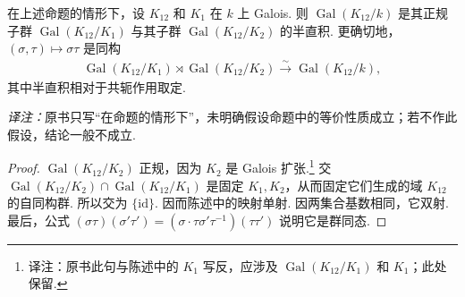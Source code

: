 \begin{corollary*}在上述命题的情形下，设 $K_{12}$ 和 $K_1$ 在 $k$ 上 Galois. 则 $\operatorname{Gal}(K_{12}/k)$ 是其正规子群 $\operatorname{Gal}(K_{12}/K_1)$ 与其子群 $\operatorname{Gal}(K_{12}/K_2)$ 的半直积. 更确切地，$(\sigma,\tau)\mapsto\sigma\tau$ 是同构
\begin{align*}\operatorname{Gal}(K_{12}/K_1)\rtimes\operatorname{Gal}(K_{12}/K_2)\xrightarrow{\sim}\operatorname{Gal}(K_{12}/k),\end{align*}
其中半直积相对于共轭作用取定.\end{corollary*}
\noindent\emph{译注：}原书只写``在命题的情形下''，未明确假设命题中的等价性质成立；若不作此假设，结论一般不成立.
\begin{proof}$\operatorname{Gal}(K_{12}/K_2)$ 正规，因为 $K_2$ 是 Galois 扩张.\footnote{译注：原书此句与陈述中的 $K_1$ 写反，应涉及 $\operatorname{Gal}(K_{12}/K_1)$ 和 $K_1$；此处保留.} 交 $\operatorname{Gal}(K_{12}/K_2)\cap\operatorname{Gal}(K_{12}/K_1)$ 是固定 $K_1,K_2$，从而固定它们生成的域 $K_{12}$ 的自同构群. 所以交为 $\{\mathrm{id}\}$. 因而陈述中的映射单射. 因两集合基数相同，它双射. 最后，公式 $(\sigma\tau)(\sigma'\tau')=(\sigma\cdot\tau\sigma'\tau^{-1})(\tau\tau')$ 说明它是群同态.\end{proof}
